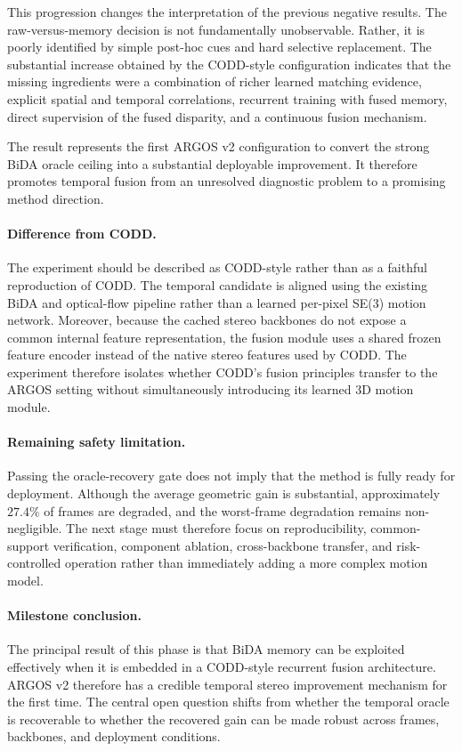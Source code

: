 \documentclass[11pt,a4paper]{article}
\begin{document}
This progression changes the interpretation of the previous negative results. The
raw-versus-memory decision is not fundamentally unobservable. Rather, it is poorly
identified by simple post-hoc cues and hard selective replacement. The substantial
increase obtained by the CODD-style configuration indicates that the missing ingredients
were a combination of richer learned matching evidence, explicit spatial and temporal
correlations, recurrent training with fused memory, direct supervision of the fused
disparity, and a continuous fusion mechanism.

The result represents the first ARGOS v2 configuration to convert the strong BiDA oracle
ceiling into a substantial deployable improvement. It therefore promotes temporal fusion
from an unresolved diagnostic problem to a promising method direction.

\paragraph{Difference from CODD.}
The experiment should be described as CODD-style rather than as a faithful reproduction
of CODD. The temporal candidate is aligned using the existing BiDA and optical-flow
pipeline rather than a learned per-pixel SE(3) motion network. Moreover, because the
cached stereo backbones do not expose a common internal feature representation, the
fusion module uses a shared frozen feature encoder instead of the native stereo features
used by CODD. The experiment therefore isolates whether CODD's fusion principles transfer
to the ARGOS setting without simultaneously introducing its learned 3D motion module.

\paragraph{Remaining safety limitation.}
Passing the oracle-recovery gate does not imply that the method is fully ready for
deployment. Although the average geometric gain is substantial, approximately
\(27.4\%\) of frames are degraded, and the worst-frame degradation remains non-negligible.
The next stage must therefore focus on reproducibility, common-support verification,
component ablation, cross-backbone transfer, and risk-controlled operation rather than
immediately adding a more complex motion model.

\paragraph{Milestone conclusion.}
The principal result of this phase is that BiDA memory can be exploited effectively when
it is embedded in a CODD-style recurrent fusion architecture. ARGOS v2 therefore has a
credible temporal stereo improvement mechanism for the first time. The central open
question shifts from whether the temporal oracle is recoverable to whether the recovered
gain can be made robust across frames, backbones, and deployment conditions.
\end{document}
